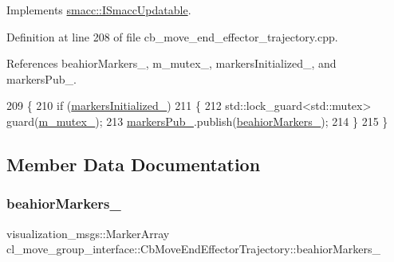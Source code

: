 Implements \hyperlink{classsmacc_1_1ISmaccUpdatable_a84ee0520cbefdb1d412bed54650b028e}{smacc\+::\+I\+Smacc\+Updatable}.



Definition at line 208 of file cb\+\_\+move\+\_\+end\+\_\+effector\+\_\+trajectory.\+cpp.



References beahior\+Markers\+\_\+, m\+\_\+mutex\+\_\+, markers\+Initialized\+\_\+, and markers\+Pub\+\_\+.


\begin{DoxyCode}
209     \{
210         \textcolor{keywordflow}{if} (\hyperlink{classcl__move__group__interface_1_1CbMoveEndEffectorTrajectory_ac140a7f0adfb20f1e2900a5c8cd2ca5b}{markersInitialized\_})
211         \{
212             std::lock\_guard<std::mutex> guard(\hyperlink{classcl__move__group__interface_1_1CbMoveEndEffectorTrajectory_a2a98ef725cb3fc7f61654d3d6a2066bb}{m\_mutex\_});
213             \hyperlink{classcl__move__group__interface_1_1CbMoveEndEffectorTrajectory_aabc2216b2d8625fecd83c5ec69928e63}{markersPub\_}.publish(\hyperlink{classcl__move__group__interface_1_1CbMoveEndEffectorTrajectory_a809fb5385adf27c0a1c8f8136566949c}{beahiorMarkers\_});
214         \}
215     \}
\end{DoxyCode}


\subsection{Member Data Documentation}
\mbox{\label{classcl__move__group__interface_1_1CbMoveEndEffectorTrajectory_a809fb5385adf27c0a1c8f8136566949c}} 
\subsubsection{\texorpdfstring{beahior\+Markers\+\_\+}{beahiorMarkers\_}}
{\footnotesize\ttfamily visualization\+\_\+msgs\+::\+Marker\+Array cl\+\_\+move\+\_\+group\+\_\+interface\+::\+Cb\+Move\+End\+Effector\+Trajectory\+::beahior\+Markers\+\_\+\hspace{0.3cm}{\ttfamily [protected]}}



